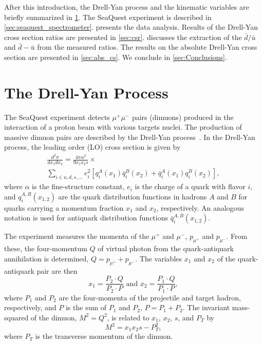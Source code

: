 \documentclass[reprint,aps,unsortedaddress,superscriptaddress,prc,floatfix,showpacs,linenumbers,final]{revtex4-2}
\begin{document}
After this introduction, the Drell-Yan process and the kinematic variables are briefly summarized in \cref{sec:drell-yan}.
The SeaQuest experiment is described in \cref{sec:seaquest_spectrometer}.
 presents the data analysis.
Results of the Drell-Yan cross section ratios are presented in \cref{sec:csr}.
 discusses the extraction of the $\bar{d}/\bar{u}$ and $\bar{d}-\bar{u}$
from the measured ratios.
The results on the absolute Drell-Yan cross section are presented in \cref{sec:abs_cs}.
We conclude in \cref{sec:Conclusions}.

\section{The Drell-Yan Process}
\label{sec:drell-yan}
The SeaQuest experiment detects $\mu^+\mu^-$ pairs (dimuons) produced in the interaction of a proton
beam with various targets nuclei. The production of massive dimuon pairs are described by the Drell-Yan
process~\cite{drell1970}. In the Drell-Yan process, the leading order (LO) cross section is given by
\begin{multline}
	\frac{d^2\sigma}{dx_1dx_2}=\frac{4\pi \alpha^2}{9x_1x_2s} \times
	\label{eq:DYCross} \\
	\sum_{i\in u,d,s,\dots} e_i^2 \left[q_i^A\left(x_1\right) \bar q_i^B\left(x_2\right) + \bar q_i^A\left(x_1\right)
		q_i^B\left(x_2\right)\right],
\end{multline}
where $\alpha$ is the fine-structure constant, $e_i$ is the charge of a quark with flavor $i$,
and $q_i^{A,B}\left(x_{1,2}\right)$ are the quark distribution functions in hadrons $A$ and $B$
for quarks carrying a momentum fraction $x_1$ and $x_2$, respectively.
An analogous notation is used for antiquark distribution functions $\bar q_i^{A,B}\left(x_{1,2}\right)$.

The experiment measures the momenta of the $\mu^+$ and $\mu^-$, $p_{\mu^+}$ and $p_{\mu^-}$.
From these, the four-momentum $Q$ of virtual photon from the quark-antiquark annihilation is determined,
$Q = p_{\mu^+} + p_{\mu^-}$.
The variables $x_1$ and $x_2$ of the quark-antiquark pair are then
\begin{equation}
	x_1 = \frac{P_2 \cdot Q}{P_2 \cdot P} \text{ and } x_2 =
	\frac{P_1 \cdot Q}{P_1 \cdot P},
	\label{def_x1x2}
\end{equation}
where $P_1$ and $P_2$ are the four-momenta of the projectile and target hadron,
respectively, and $P$ is the sum of $P_1$ and $P_2$, $P=P_1+P_2$.
The invariant mass-squared of the dimuon, $M^2 = Q^2$, is related to $x_1$, $x_2$, $s$, and $P_T$ by
\begin{equation}
	M^2=x_1 x_2 s - P_T^2,
	\label{def_mass}
\end{equation}
where $P_T$ is the transverse momentum of the dimuon.
\end{document}
